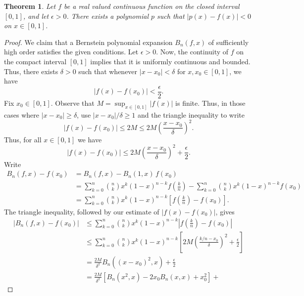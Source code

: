 \documentclass[11pt]{article}
\newtheorem{theorem}{Theorem}[section]
\theoremstyle{definition}
\theoremstyle{remark}
\begin{document}
    \begin{theorem}
        Let $f$ be a real valued continuous function on the closed interval $[0, 1]$,
        and let $\epsilon > 0$. There exists a polynomial $p$ such that $|p(x) -
        f(x)| < 0$ on $x \in [0, 1]$.
    \end{theorem}
    \begin{proof} \label{theo:weierstrass}
        We claim that a Bernstein polynomial expansion $B_n(f, x)$ of sufficiently
        high order satisfies the given conditions. Let $\epsilon > 0$.  Now, the
        continuity of $f$ on the compact interval $[0, 1]$ implies that it is
        uniformly continuous and bounded. Thus, there exists $\delta > 0$ such that
        whenever $|x - x_0| < \delta$ for $x, x_0 \in [0, 1]$, we have \[
            |f(x) - f(x_0)| < \frac{\epsilon}{2}.
        \] Fix $x_0 \in [0, 1]$. Observe that $M = \sup_{x \in [0, 1]} |f(x)|$ is
        finite. Thus, in those cases where $|x - x_0| \geq \delta$, use $|x - x_0| /
        \delta \geq 1$ and the triangle inequality to write \[
            |f(x) - f(x_0)| \leq 2M \leq 2M \left(\frac{x - x_0}{\delta}\right)^2.
        \] Thus, for all $x \in [0, 1]$ we have \[
            |f(x) - f(x_0)| \leq 2M \left(\frac{x - x_0}{\delta}\right)^2 +
            \frac{\epsilon}{2}.
        \]
        Write
        \begin{align*}
            B_n(f, x) - f(x_0) &= B_n(f, x) - B_n(1, x)\,f(x_0) \\
            &= \sum_{k = 0}^n \binom{n}{k} x^k(1 - x)^{n - k}f \left(
            \frac{k}{n} \right) - \sum_{k = 0}^n \binom{n}{k} x^k(1 - x)^{n - k}f(x_0)
            \\
            &= \sum_{k = 0}^n \binom{n}{k} x^k(1 - x)^{n - k}\left[ f\left(
            \frac{k}{n} \right) - f(x_0)\right].
        \end{align*}
        The triangle inequality, followed by our estimate of $|f(x) - f(x_0)|$, gives 
        \begin{align*}
            |B_n(f, x) - f(x_0)| &\leq \sum_{k = 0}^n \binom{n}{k} x^k(1 - x)^{n -
            k}\left| f\left( \frac{k}{n} \right) - f(x_0)\right| \\
            &\leq \sum_{k = 0}^n \binom{n}{k} x^k(1 - x)^{n -
            k}\left[ 2M\left(\frac{k / n - x_0}{\delta}\right)^2 + \frac{\epsilon}{2}
            \right] \\
            &= \frac{2M}{\delta^2} B_n((x - x_0)^2, x) + \frac{\epsilon}{2} \\
            &= \frac{2M}{\delta^2} \left[B_n(x^2, x) - 2x_0B_n(x, x) + x_0^2\right] +

\end{align*}
\end{proof}
\end{document}
